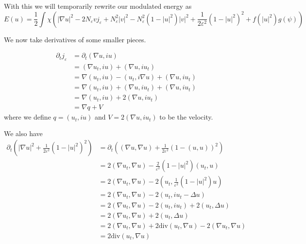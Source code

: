 \documentclass[a4paper]{article}
\renewcommand{\div}{\mathrm{div}}
\begin{document}
With this we will temporarily rewrite our modulated energy as
\begin{equation} \label{eqn:mod_energy2}
  E(u) = \frac{1}{2} \int \chi \left( |\nabla u|^2 - 2N_\varepsilon v j_\varepsilon + N_\varepsilon^2 |v|^2 - N_\varepsilon^2(1-|u|^2)|v|^2 +
  \frac{1}{2 \varepsilon^2} (1 - |u|^2)^2 + f(|u|^2) g(\psi) \right)
\end{equation}

We now take derivatives of some smaller pieces.

\begin{align}
  \partial_t j_\varepsilon &= \partial_t (\nabla u, iu) \nonumber \\
  &= ( \nabla u_t, iu) + ( \nabla u, i u_t) \nonumber \\
  &= \nabla (u_t, iu) - (u_t, i \nabla u) + (\nabla u, iu_t) \nonumber \\
  &= \nabla (u_t, iu) + (\nabla u, iu_t) + (\nabla u, iu_t) \nonumber \\
  &= \nabla (u_t, iu) + 2 (\nabla u, iu_t) \nonumber \\
  &= \nabla q + V
  \label{eqn:deriv_current}
\end{align}
where we define $q = (u_t, iu)$ and $V=2(\nabla u, iu_t)$ to be the velocity.

We also have
\begin{align}
  \partial_t \left( |\nabla u|^2 + \frac{1}{2 \varepsilon^2} (1-|u|^2)^2 \right)
  &= \partial_t \left( (\nabla u, \nabla u) + \frac{1}{2 \varepsilon^2} (1-(u,u))^2 \right) \nonumber \\
  &= 2 (\nabla u_t, \nabla u) - \frac{2}{\varepsilon^2} (1-|u|^2) (u_t, u) \nonumber \\
  &= 2( \nabla u_t, \nabla u) - 2 ( u_t, \frac{1}{\varepsilon^2} (1-|u|^2)u ) \nonumber \\
  &= 2( \nabla u_t, \nabla u) - 2( u_t, iu_t - \Delta u) \nonumber \\
  &= 2( \nabla u_t, \nabla u) - 2( u_t, i u_t) + 2(u_t, \Delta u) \nonumber \\
  &= 2( \nabla u_t, \nabla u) + 2(u_t, \Delta u) \nonumber \\
  &= 2( \nabla u_t, \nabla u) + 2 \div (u_t, \nabla u) - 2 (\nabla u_t, \nabla u) \nonumber \\
  &= 2 \div (u_t, \nabla u)
  \label{eqn:deriv_?}
\end{align}
\end{document}
